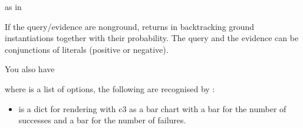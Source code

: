 \documentclass[letterpaper,10pt,english]{sphinxmanual}
\begin{document}
\begin{sphinxVerbatim}[commandchars=\\\{\}]
  
\end{sphinxVerbatim}

\sphinxAtStartPar
as in

\begin{sphinxVerbatim}[commandchars=\\\{\}]
 
\end{sphinxVerbatim}

\sphinxAtStartPar
If the query/evidence are non\sphinxhyphen{}ground,  returns in backtracking ground
instantiations together with their probability.
The query and the evidence can be conjunctions of literals (positive or negative).

\sphinxAtStartPar
You also have

\begin{sphinxVerbatim}[commandchars=\\\{\}]
  
\end{sphinxVerbatim}

\sphinxAtStartPar
where  is a list of options, the following are recognised by :
\begin{itemize}
\item {} 
\sphinxAtStartPar
{}  is a dict for rendering with c3 as a bar chart with a bar for the number of successes and a bar for the number of failures.

\end{itemize}
\end{document}
